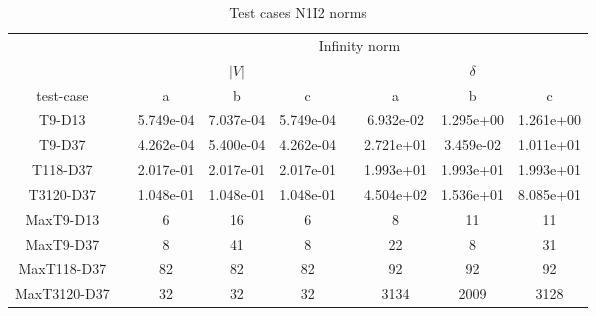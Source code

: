 \begin{table}
\renewcommand{\arraystretch}{1.3}
\centering
\label{}\hspace{2cm}\caption{Test cases N1I2 norms}
\begin{adjustbox}{width=1\textwidth} %
\small
\begin{tabular}{ccccccccc}
\toprule
{} && \multicolumn{7}{c}{Infinity norm}   \\
\cmidrule{3-9}
{} && \multicolumn{3}{c}{$|V|$} && \multicolumn{3}{c}{$\delta$}  \\
\cmidrule{3-5}\cmidrule{7-9}
 test-case &&        a &        b &       c &&        a &       b &        c \\
\midrule
T9-D13       &&  5.749e-04 &  7.037e-04 &  5.749e-04 &&  6.932e-02 &  1.295e+00 &  1.261e+00 \\
T9-D37       &&  4.262e-04 &  5.400e-04 &  4.262e-04 &&  2.721e+01 &  3.459e-02 &  1.011e+01 \\
T118-D37     &&  2.017e-01 &  2.017e-01 &  2.017e-01 &&  1.993e+01 &  1.993e+01 &  1.993e+01 \\
T3120-D37    &&  1.048e-01 &  1.048e-01 &  1.048e-01 &&  4.504e+02 &  1.536e+01 &  8.085e+01 \\
MaxT9-D13    &&          6 &         16 &          6 &&          8 &         11 &         11 \\
MaxT9-D37    &&          8 &         41 &          8 &&         22 &          8 &         31 \\
MaxT118-D37  &&         82 &         82 &         82 &&         92 &         92 &         92 \\
MaxT3120-D37 &&         32 &         32 &         32 &&       3134 &       2009 &       3128 \\
\bottomrule
\end{tabular}
\end{adjustbox}\end{table}
